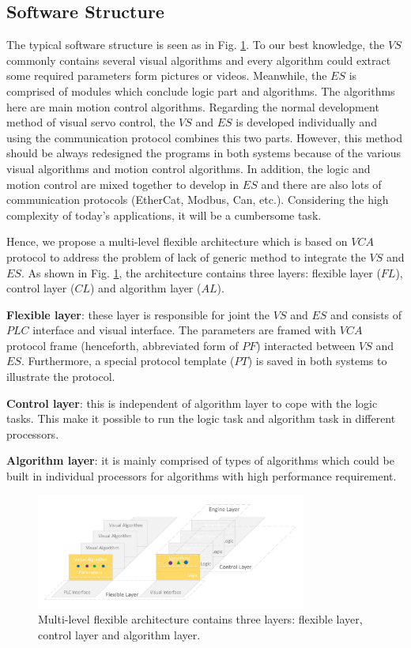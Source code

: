 \documentclass[journal,UTF8]{IEEEtran}
\begin{document}
\subsection{Software Structure}
The typical software structure is seen as in Fig. \ref{fig:Software}. To our best knowledge, the $VS$ commonly contains several visual algorithms and every algorithm could extract some required parameters form pictures or videos. Meanwhile, the $ES$ is comprised of modules which conclude logic part and algorithms. The algorithms here are main motion control algorithms. Regarding the normal development method of visual servo control, the $VS$ and $ES$ is developed individually and using the communication protocol combines this two parts. However, this method should be always redesigned the programs in both systems because of the various visual algorithms and motion control algorithms. In addition, the logic and motion control are mixed together to develop in $ES$ and there are also lots of communication protocols (EtherCat, Modbus, Can, etc.). Considering the high complexity of today’s applications, it will be a cumbersome task.

Hence, we propose a multi-level flexible architecture which is based on $VCA$ protocol to address the problem of lack of generic method to integrate the $VS$ and $ES$. As shown in Fig. \ref{fig:Software}, the architecture contains three layers: flexible layer ($FL$), control layer ($CL$) and algorithm layer ($AL$).

\textbf{Flexible layer}: these layer is responsible for joint the $VS$ and $ES$ and consists of $PLC$ interface and visual interface. The parameters are framed with $VCA$ protocol frame (henceforth, abbreviated form of $PF$) interacted between $VS$ and $ES$. Furthermore, a special protocol template ($PT$) is saved in both systems to illustrate the protocol.

\textbf{Control layer}: this is independent of algorithm layer to cope with the logic tasks. This make it possible to run the logic task and algorithm task in different processors.

\textbf{Algorithm layer}: it is mainly comprised of types of algorithms which could be built in individual processors for algorithms with high performance requirement. 


\begin{figure}
	\centering
	\includegraphics[width=3.5in]{fig/Software.pdf}
	\caption{Multi-level flexible architecture contains three layers: flexible layer, control layer and algorithm layer.}
	\label{fig:Software}
\end{figure}
\end{document}

